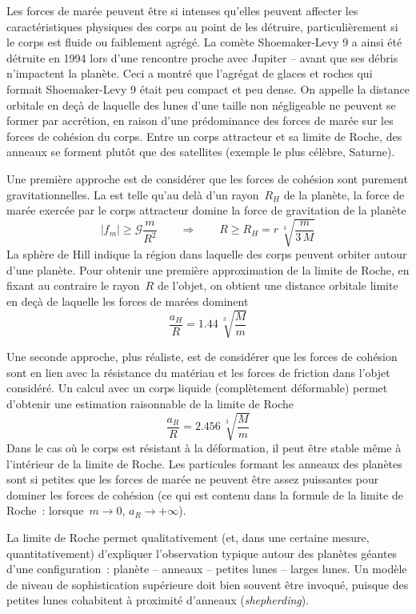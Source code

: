 \sk
Les forces de marée peuvent être si intenses qu'elles peuvent affecter les caractéristiques physiques des corps au point de les détruire, particulièrement si le corps est fluide ou faiblement agrégé. La comète Shoemaker-Levy 9 a ainsi été détruite en 1994 lors d'une rencontre proche avec Jupiter -- avant que ses débris n'impactent la planète. Ceci a montré que l'agrégat de glaces et roches qui formait Shoemaker-Levy 9 était peu compact et peu dense. On appelle  la distance orbitale en deçà de laquelle des lunes d'une taille non négligeable ne peuvent se former par accrétion, en raison d'une prédominance des forces de marée sur les forces de cohésion du corps. Entre un corps attracteur et sa limite de Roche, des anneaux se forment plutôt que des satellites (exemple le plus célèbre, Saturne).

\sk
Une première approche est de considérer que les forces de cohésion sont purement gravitationnelles. La  est telle qu'au delà d'un rayon~$R_H$ de la planète, la force de marée exercée par le corps attracteur domine la force de gravitation de la planète
\[ |f_m| \geq \mathcal{G} \frac{m}{R^2} \qquad \Rightarrow \qquad R \geq R_H = r \, \sqrt[3]{ \frac{m}{3\,M} } \]
La sphère de Hill indique la région dans laquelle des corps peuvent orbiter autour d'une planète. Pour obtenir une première approximation de la limite de Roche, en fixant au contraire le rayon~$R$ de l'objet, on obtient une distance orbitale limite en deçà de laquelle les forces de marées dominent
\[ \frac{a_H}{R} = 1.44 \, \sqrt[3]{ \frac{M}{m} } \]

\sk
Une seconde approche, plus réaliste, est de considérer que les forces de cohésion sont en lien avec la résistance du matériau et les forces de friction dans l'objet considéré. Un calcul avec un corps liquide (complètement déformable) permet d'obtenir une estimation raisonnable de la limite de Roche
\[ \frac{a_R}{R} = 2.456 \, \sqrt[3]{ \frac{M}{m} } \]
\noindent Dans le cas où le corps est résistant à la déformation, il peut être stable même à l'intérieur de la limite de Roche. Les particules formant les anneaux des planètes sont si petites que les forces de marée ne peuvent être assez puissantes pour dominer les forces de cohésion (ce qui est contenu dans la formule de la limite de Roche~: lorsque~$m \rightarrow 0$, $a_R \rightarrow +\infty$).

\sk
La limite de Roche permet qualitativement (et, dans une certaine mesure, quantitativement) d'expliquer l'observation typique autour des planètes géantes d'une configuration~: planète -- anneaux -- petites lunes -- larges lunes. Un modèle de niveau de sophistication supérieure doit bien souvent être invoqué, puisque des petites lunes cohabitent à proximité d'anneaux (\emph{shepherding}).

